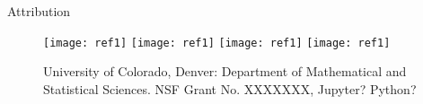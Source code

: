   \begin{block}{Attribution}
    \centering
    \begin{figure}
        \texttt{[image: ref1]}
        \texttt{[image: ref1]}
        \texttt{[image: ref1]}
        \texttt{[image: ref1]}
    \caption{University of Colorado, Denver: Department of Mathematical and Statistical Sciences. NSF Grant No. XXXXXXX, Jupyter? Python?}
    \end{figure}
   

  \end{block}



